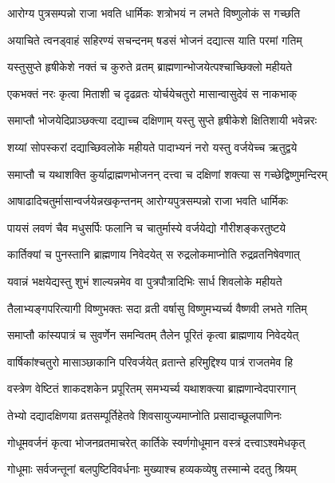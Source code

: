 \twolineshloka
{आरोग्य पुत्रसम्पन्नो राजा भवति धार्मिकः}
{शत्रोभयं न लभते विष्णुलोकं स गच्छति} %

\twolineshloka
{अयाचिते त्वनड्वाहं सहिरण्यं सचन्दनम्}
{षडसं भोजनं दद्यात्स याति परमां गतिम्} %

\twolineshloka
{यस्तुसुप्ते हृषीकेशे नक्तं च कुरुते व्रतम्}
{ब्राह्मणान्भोजयेत्पश्चाच्छिक्लो महीयते} %

\twolineshloka
{एकभक्तं नरः कृत्वा मिताशी च दृढव्रतः}
{योर्चयेचतुरो मासान्वासुदेवं स नाकभाक्} %

\twolineshloka
{समाप्तौ भोजयेदिप्राञ्छक्त्या दद्याच्च दक्षिणाम्}
{यस्तु सुप्ते हृषीकेशे क्षितिशायी भवेन्नरः} %

\twolineshloka
{शय्यां सोपस्करां दद्याच्छिवलोके महीयते}
{पादाभ्यनं नरो यस्तु वर्जयेच्च ऋतुद्वये} %

\twolineshloka
{समाप्तौ च यथाशक्ति कुर्याद्राह्मणभोजनन्}
{दत्त्वा च दक्षिणां शक्त्या स गच्छेद्विष्णुमन्दिरम्} %

\twolineshloka
{आषाढादिचतुर्मासान्वर्जयेन्नखकृन्तनम्}
{आरोग्यपुत्रसम्पन्नो राजा भवति धार्मिकः} %

\twolineshloka
{पायसं लवणं चैव मधुसर्पिः फलानि च}
{चातुर्मास्ये वर्जयेद्यो गौरीशङ्करतुष्टये} %

\twolineshloka
{कार्तिक्यां च पुनस्तानि ब्राह्मणाय निवेदयेत्}
{स रुद्रलोकमाप्नोति रुद्रव्रतनिषेवणात्} %

\twolineshloka
{यवान्नं भक्षयेद्यस्तु शुभं शाल्यन्नमेव वा}
{पुत्रपौत्रादिभिः सार्ध शिवलोके महीयते} %

\twolineshloka
{तैलाभ्यङ्गपरित्यागी विष्णुभक्तः सदा व्रती}
{वर्षासु विष्णुमभ्यर्च्य वैष्णवी लभते गतिम्} %

\twolineshloka
{समाप्तौ कांस्यपात्रं च सुवर्णेन समन्वितम्}
{तैलेन पूरितं कृत्वा ब्राह्मणाय निवेदयेत्} %

\twolineshloka
{वार्षिकांश्चतुरो मासाञ्छाकानि परिवर्जयेत्}
{व्रतान्ते हरिमुद्दिश्य पात्रं राजतमेव हि} %

\twolineshloka
{वस्त्रेण वेष्टितं शाकदशकेन प्रपूरितम्}
{समभ्यर्च्य यथाशक्त्या ब्राह्मणान्वेदपारगान्} %

\twolineshloka
{तेभ्यो दद्यादक्षिणया व्रतसम्पूर्तिहेतवे}
{शिवसायुज्यमाप्नोति प्रसादाच्छूलपाणिनः} %

\twolineshloka
{गोधूमवर्जनं कृत्वा भोजनव्रतमाचरेत्}
{कार्तिके स्वर्णगोधूमान वस्त्रं दत्त्वाऽश्वमेधकृत्} %

\twolineshloka
{गोधूमाः सर्वजन्तूनां बलपुष्टिविवर्धनाः}
{मुख्याश्च हव्यकव्येषु तस्मान्मे ददतु श्रियम्} %

